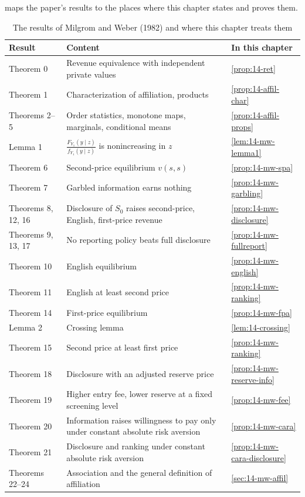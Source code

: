  maps the paper's results to the places where this chapter states and proves them.

\begin{table}[htbp]
  \centering
  \caption{The results of Milgrom and Weber (1982) and where this chapter treats them}\label{tab:14-mw-theorems}
  \small
  \begin{tabularx}{\textwidth}{@{}lXl@{}}
    \toprule
    Result & Content & In this chapter\\
    \midrule
    Theorem 0 & Revenue equivalence with independent private values & \cref{prop:14-ret}\\
    Theorem 1 & Characterization of affiliation, products & \cref{prop:14-affil-char}\\
    Theorems 2--5 & Order statistics, monotone maps, marginals, conditional means & \cref{prop:14-affil-props}\\
    Lemma 1 & $\frac{F_{Y_1}(y\mid z)}{f_{Y_1}(y\mid z)}$ is nonincreasing in $z$ & \cref{lem:14-mw-lemma1}\\
    Theorem 6 & Second-price equilibrium $v(s,s)$ & \cref{prop:14-mw-spa}\\
    Theorem 7 & Garbled information earns nothing & \cref{prop:14-mw-garbling}\\
    Theorems 8, 12, 16 & Disclosure of $S_0$ raises second-price, English, first-price revenue &
      \cref{prop:14-mw-disclosure}\\
    Theorems 9, 13, 17 & No reporting policy beats full disclosure & \cref{prop:14-mw-fullreport}\\
    Theorem 10 & English equilibrium & \cref{prop:14-mw-english}\\
    Theorem 11 & English at least second price & \cref{prop:14-mw-ranking}\\
    Theorem 14 & First-price equilibrium & \cref{prop:14-mw-fpa}\\
    Lemma 2 & Crossing lemma & \cref{lem:14-crossing}\\
    Theorem 15 & Second price at least first price & \cref{prop:14-mw-ranking}\\
    Theorem 18 & Disclosure with an adjusted reserve price & \cref{prop:14-mw-reserve-info}\\
    Theorem 19 & Higher entry fee, lower reserve at a fixed screening level & \cref{prop:14-mw-fee}\\
    Theorem 20 & Information raises willingness to pay only under constant absolute risk aversion &
      \cref{prop:14-mw-cara}\\
    Theorem 21 & Disclosure and ranking under constant absolute risk aversion & \cref{prop:14-mw-cara-disclosure}\\
    Theorems 22--24 & Association and the general definition of affiliation & \cref{sec:14-mw-affil}\\
    \bottomrule
  \end{tabularx}
\end{table}

